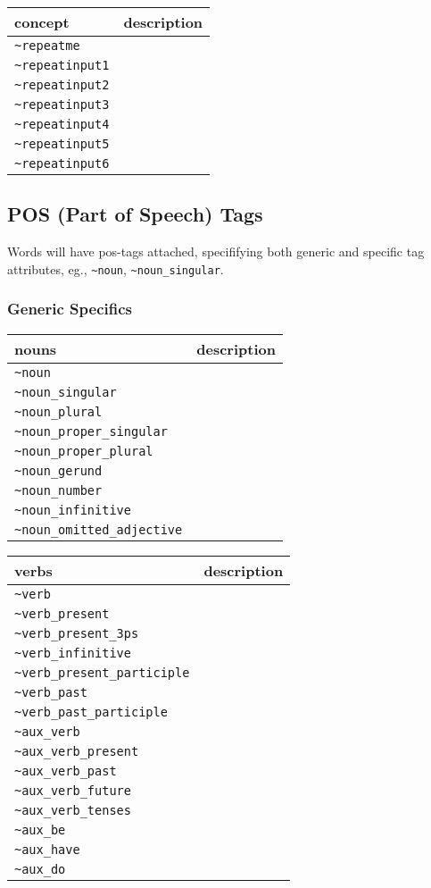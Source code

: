 \documentclass[]{article}
\begin{document}
\begin{longtable}[]{@{}ll@{}}
\toprule
concept & description\tabularnewline
\midrule
\endhead
\texttt{\textasciitilde{}repeatme} &\tabularnewline
\texttt{\textasciitilde{}repeatinput1} &\tabularnewline
\texttt{\textasciitilde{}repeatinput2} &\tabularnewline
\texttt{\textasciitilde{}repeatinput3} &\tabularnewline
\texttt{\textasciitilde{}repeatinput4} &\tabularnewline
\texttt{\textasciitilde{}repeatinput5} &\tabularnewline
\texttt{\textasciitilde{}repeatinput6} &\tabularnewline
\bottomrule
\end{longtable}

\subsection{POS (Part of Speech) Tags}\label{pos-part-of-speech-tags}

Words will have pos-tags attached, specififying both generic and
specific tag attributes, eg., \texttt{\textasciitilde{}noun},
\texttt{\textasciitilde{}noun\_singular}.

\subsubsection{Generic Specifics}\label{generic-specifics}

\begin{longtable}[]{@{}ll@{}}
\toprule
nouns & description\tabularnewline
\midrule
\endhead
\texttt{\textasciitilde{}noun} &\tabularnewline
\texttt{\textasciitilde{}noun\_singular} &\tabularnewline
\texttt{\textasciitilde{}noun\_plural} &\tabularnewline
\texttt{\textasciitilde{}noun\_proper\_singular} &\tabularnewline
\texttt{\textasciitilde{}noun\_proper\_plural} &\tabularnewline
\texttt{\textasciitilde{}noun\_gerund} &\tabularnewline
\texttt{\textasciitilde{}noun\_number} &\tabularnewline
\texttt{\textasciitilde{}noun\_infinitive} &\tabularnewline
\texttt{\textasciitilde{}noun\_omitted\_adjective} &\tabularnewline
\bottomrule
\end{longtable}

\begin{longtable}[]{@{}ll@{}}
\toprule
verbs & description\tabularnewline
\midrule
\endhead
\texttt{\textasciitilde{}verb} &\tabularnewline
\texttt{\textasciitilde{}verb\_present} &\tabularnewline
\texttt{\textasciitilde{}verb\_present\_3ps} &\tabularnewline
\texttt{\textasciitilde{}verb\_infinitive} &\tabularnewline
\texttt{\textasciitilde{}verb\_present\_participle} &\tabularnewline
\texttt{\textasciitilde{}verb\_past} &\tabularnewline
\texttt{\textasciitilde{}verb\_past\_participle} &\tabularnewline
\texttt{\textasciitilde{}aux\_verb} &\tabularnewline
\texttt{\textasciitilde{}aux\_verb\_present} &\tabularnewline
\texttt{\textasciitilde{}aux\_verb\_past} &\tabularnewline
\texttt{\textasciitilde{}aux\_verb\_future} &\tabularnewline
\texttt{\textasciitilde{}aux\_verb\_tenses} &\tabularnewline
\texttt{\textasciitilde{}aux\_be} &\tabularnewline
\texttt{\textasciitilde{}aux\_have} &\tabularnewline
\texttt{\textasciitilde{}aux\_do} &\tabularnewline
\bottomrule
\end{longtable}
\end{document}
